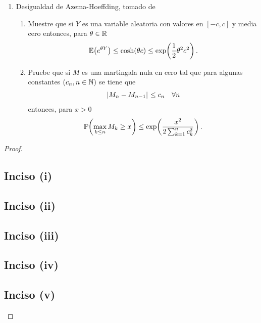 \begin{problema}
\begin{enumerate}
		\item[(v)]		[\ref{problema2_3:inciso4}]
			Desigualdad de Azema-Hoeffding, tomado de \cite[E14.2, p.237]{MR1155402}
			\begin{enumerate}
				\item[(v.i)] [\ref{problema2_3:subinciso5_1}]
						Muestre que si $Y$ es una variable aleatoria con valores en $[-c,c]$ y 
						media cero entonces, para $\theta\in\mathbb{R}$
						\begin{align}
							\mathbb{E}\! \left( e^{\theta Y} \right)\leq\cosh\!\left( \theta c\right) \leq \exp\!\left( \frac{1}{2}\theta^2c^2\right) . 
						\end{align}
				\item[(v.ii)] [\ref{problema2_3:subinciso5_2}]
						Pruebe que si $M$ es una martingala nula en cero tal que para algunas 
						constantes $\left( c_n,n\in\mathbb{N}\right) $ se tiene que
						\begin{align}
							\hspace{.25mm}\left|M_n-M_{n-1}\right|\hspace{.25mm}\leq c_n\quad\forall n
						\end{align}
						entonces, para $x>0$
						\begin{align}
							\mathbb{P}\! \left( \max_{k\leq n} M_k\geq x \right)\leq \exp\!\left( \frac{x^2}{2\sum_{k=1}^n c_k^2}\right) .
						\end{align}
			\end{enumerate}
	\end{enumerate}
\end{problema}

\begin{proof}
	\subsection{Inciso (i)}		\label{problema2_3:inciso1}
	
	\newpage
	
	\subsection{Inciso (ii)}	\label{problema2_3:inciso2}
	
	\newpage
		
	\subsection{Inciso (iii)}	\label{problema2_3:inciso3}
	
	\newpage
	
	\subsection{Inciso (iv)}	\label{problema2_3:inciso4}
	
	\newpage
	
	\subsection{Inciso (v)}		\label{problema2_3:inciso5}
	
\end{proof}
